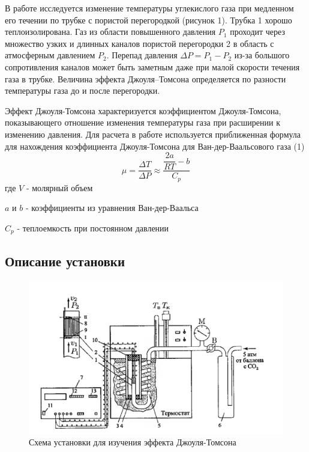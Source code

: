 \documentclass[a4paper,12pt]{article} %
\begin{document}
В работе исследуется изменение температуры углекислого газа
при медленном его течении по трубке с пористой перегородкой (рисунок 1). Трубка 1 хорошо теплоизолирована.
Газ из области повышенного давления $P_1$ проходит через множество узких и длинных каналов пористой перегородки 2 в область с атмосферным давлением
$P_2$. Перепад давления $\Delta P = P_1-P_2$ из-за большого сопротивления каналов может быть заметным даже при малой скорости течения газа в трубке. Величина эффекта Джоуля–Томсона определяется по
разности температуры газа до
и после перегородки.

Эффект Джоуля-Томсона характеризуется коэффициентом Джоуля-Томсона, показывающего отношение изменения температуры газа при расширении к изменению давления. Для расчета в работе используется приближенная формула для нахождения коэффициента Джоуля-Томсона для Ван-дер-Ваальсового газа (1)
\begin{equation}
\mu = \dfrac{\Delta T}{\Delta P} \approx \dfrac{\dfrac{2a}{RT}-b}{C_p} 
\end{equation}
где $V$ - молярный объем

$a$ и $b$ - коэффициенты из уравнения Ван-дер-Ваальса

$C_p$ - теплоемкость при постоянном давлении 
\subsection{Описание установки}
 
 \begin{figure}[h]

\centering

\includegraphics[width=0.8\linewidth]{lab 2.1.6.png}

\caption{Схема установки для изучения эффекта Джоуля-Томсона}

\label{fig:mpr}

\end{figure}
\end{document}
